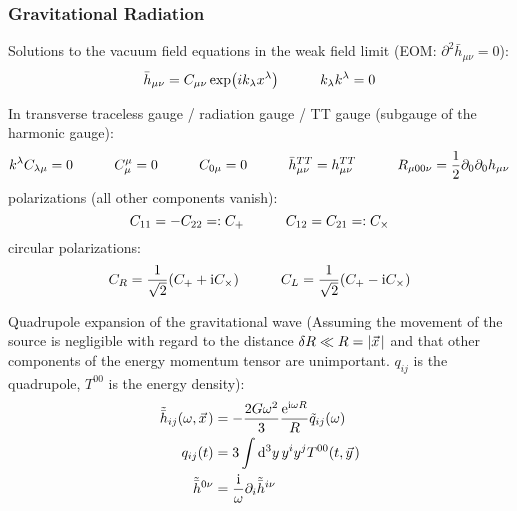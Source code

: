 		\subsubsection{Gravitational Radiation}
			Solutions to the vacuum field equations in the weak field limit (EOM: $\partial^2 \bar{h}_{\mu\nu} = 0$):
			\begin{equation}
				\bar{h}_{\mu\nu} = C_{\mu\nu} \exp(i k_\lambda x^\lambda) \hspace{30pt} k_\lambda k^\lambda = 0
			\end{equation}

			\noindent
			In transverse traceless gauge / radiation gauge / TT gauge (subgauge of the harmonic gauge):
			\begin{equation}
				\begin{aligned}
					k^\lambda C_{\lambda\mu} &= 0
					\hspace{30pt} C^\mu_\mu = 0
					\hspace{30pt} C_{0\mu} = 0
					\hspace{30pt} \bar{h}_{\mu\nu}^{TT} = {h}_{\mu\nu}^{TT}
					\hspace{30pt} R_{\mu 0 0 \nu} = \frac{1}{2} \partial_0 \partial_0 h_{\mu\nu} \\
				\end{aligned}
			\end{equation}
			polarizations (all other components vanish):
			\begin{equation}
				C_{11} = -C_{22} =: C_+
				\hspace{30pt} C_{12} = C_{21} =: C_\times
			\end{equation}
			circular polarizations:
			\begin{equation}
				C_R = \frac{1}{\sqrt{2}} (C_+ + \mathrm{i} C_\times)
				\hspace{30pt} C_L = \frac{1}{\sqrt{2}} (C_+ - \mathrm{i} C_\times)
			\end{equation}

			\noindent
			Quadrupole expansion of the gravitational wave (Assuming the movement of the source is negligible with regard to the distance $\delta R \ll R=\abs{\vec{x}}$ and that other components of the energy momentum tensor are unimportant. $q_{ij}$ is the quadrupole, $T^{00}$ is the energy density):
			\begin{equation}
				\begin{aligned}
					\tilde{\bar{h}}_{ij}(\omega,\vec{x}) &= -\frac{2G\omega^2}{3}\frac{\ex^{\i\omega R}}{R} \tilde{q}_{ij}(\omega) \\
					q_{ij}(t) &= 3\int \dd^3 y\, y^i y^j T^{00}(t,\vec{y}) \\
					\tilde{\bar{h}}^{0\nu} &= \frac{\i}{\omega}\partial_i \tilde{\bar{h}}^{i\nu}
				\end{aligned}
			\end{equation}

